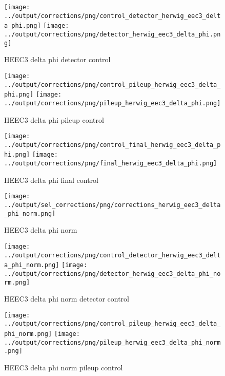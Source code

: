 \documentclass[11pt]{book}
\begin{document}
\begin{figure}[ht]
\centering
\texttt{[image: ../output/corrections/png/control\_detector\_herwig\_eec3\_delta\_phi.png]}
\texttt{[image: ../output/corrections/png/detector\_herwig\_eec3\_delta\_phi.png]}
\caption{HEEC3 delta phi detector control}
\label{fig:HEEC3_delta_phi_detector_control}
\end{figure}

\begin{figure}[ht]
\centering
\texttt{[image: ../output/corrections/png/control\_pileup\_herwig\_eec3\_delta\_phi.png]}
\texttt{[image: ../output/corrections/png/pileup\_herwig\_eec3\_delta\_phi.png]}
\caption{HEEC3 delta phi pileup control}
\label{fig:HEEC3_delta_phi_pileup_control}
\end{figure}


\begin{figure}[ht]
\centering
\texttt{[image: ../output/corrections/png/control\_final\_herwig\_eec3\_delta\_phi.png]}
\texttt{[image: ../output/corrections/png/final\_herwig\_eec3\_delta\_phi.png]}
\caption{HEEC3 delta phi final control}
\label{fig:HEEC3_delta_phi_final_control}
\end{figure}

\begin{figure}[ht]
\centering
\texttt{[image: ../output/sel\_corrections/png/corrections\_herwig\_eec3\_delta\_phi\_norm.png]}
\caption{HEEC3 delta phi norm}
\label{fig:HEEC3_delta_phi_norm}
\end{figure}

\begin{figure}[ht]
\centering
\texttt{[image: ../output/corrections/png/control\_detector\_herwig\_eec3\_delta\_phi\_norm.png]}
\texttt{[image: ../output/corrections/png/detector\_herwig\_eec3\_delta\_phi\_norm.png]}
\caption{HEEC3 delta phi norm detector control}
\label{fig:HEEC3_delta_phi_norm_detector_control}
\end{figure}

\begin{figure}[ht]
\centering
\texttt{[image: ../output/corrections/png/control\_pileup\_herwig\_eec3\_delta\_phi\_norm.png]}
\texttt{[image: ../output/corrections/png/pileup\_herwig\_eec3\_delta\_phi\_norm.png]}
\caption{HEEC3 delta phi norm pileup control}
\label{fig:HEEC3_delta_phi_norm_pileup_control}
\end{figure}
\end{document}
